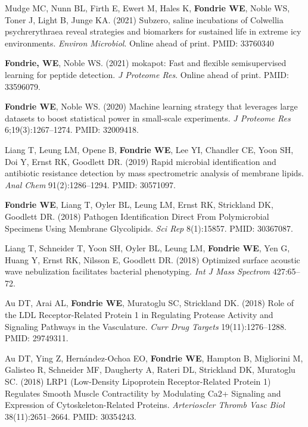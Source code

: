 \documentclass[11pt]{article}
\begin{document}
\begin{etaremune}

  \item Mudge MC, Nunn BL, Firth E, Ewert M, Hales K, \textbf{Fondrie WE},
  Noble WS, Toner J, Light B, Junge KA. (2021) Subzero, saline incubations of
  Colwellia psychrerythraea reveal strategies and biomarkers for sustained life
  in extreme icy environments. \textit{Environ Microbiol}. Online ahead of
  print. PMID: 33760340

  \item \textbf{Fondrie, WE}, Noble WS. (2021) mokapot: Fast and flexible
  semisupervised learning for peptide detection. \textit{J Proteome Res}.
  Online ahead of print. PMID: 33596079.

  \item \textbf{Fondrie WE}, Noble WS. (2020) Machine learning strategy that
  leverages large datasets to boost statistical power in small-scale
  experiments. \textit{J Proteome Res} 6;19(3):1267--1274. PMID: 32009418.
  
  \item Liang T, Leung LM, Opene B, \textbf{Fondrie WE}, Lee YI, Chandler CE,
  Yoon SH, Doi Y, Ernst RK, Goodlett DR. (2019) Rapid microbial identification
  and antibiotic resistance detection by mass spectrometric analysis of
  membrane lipids. \textit{Anal Chem} 91(2):1286--1294. PMID: 30571097.

  \item \textbf{Fondrie WE}, Liang T, Oyler BL, Leung LM, Ernst RK, Strickland
  DK, Goodlett DR. (2018) Pathogen Identification Direct From Polymicrobial
  Specimens Using Membrane Glycolipids. \textit{Sci Rep} 8(1):15857. PMID:
  30367087.
    
  \item Liang T, Schneider T, Yoon SH, Oyler BL, Leung LM, \textbf{Fondrie WE},
    Yen G, Huang Y, Ernst RK, Nilsson E, Goodlett DR. (2018) Optimized surface
    acoustic wave nebulization facilitates bacterial phenotyping. \textit{Int J
      Mass Spectrom} 427:65--72.
    
  \item Au DT, Arai AL, \textbf{Fondrie WE}, Muratoglu SC, Strickland DK. (2018)
    Role of the LDL Receptor-Related Protein 1 in Regulating Protease Activity
    and Signaling Pathways in the Vasculature. \textit{Curr Drug Targets}
    19(11):1276--1288. PMID: 29749311.

  \item Au DT, Ying Z, Hernández-Ochoa EO, \textbf{Fondrie WE}, Hampton B,
    Migliorini M, Galisteo R, Schneider MF, Daugherty A, Rateri DL, Strickland
    DK, Muratoglu SC. (2018) LRP1 (Low-Density Lipoprotein Receptor-Related
    Protein 1) Regulates Smooth Muscle Contractility by Modulating Ca2+
    Signaling and Expression of Cytoskeleton-Related Proteins.
    \textit{Arterioscler Thromb Vasc Biol} 38(11):2651--2664. PMID: 30354243.
    

\end{etaremune}
\end{document}
